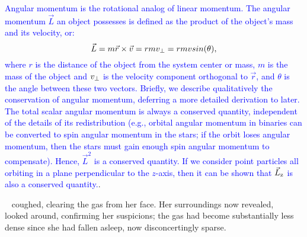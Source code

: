 \documentclass[main.tex]{subfiles}
\begin{document}
\begin{tcolorbox}[sharp corners, colback=blue!30, colframe=blue!80!blue, title=Angular Momentum]
\par \textcolor{blue} {Angular momentum is the rotational analog of linear momentum.  The angular momentum $\vec{L}$ an object possesses is defined as the product of the object's mass and its velocity, or:
\begin{equation}
\vec{L} = m\vec{r} \times \vec{v} = rmv_{\rm \perp} = rmvsin(\theta),
\end{equation}
where $r$ is the distance of the object from the system center or mass, $m$ is the mass of the object and $v_{\rm \perp}$ is the velocity component orthogonal to $\vec{r}$, and $\theta$ is the angle between these two vectors. 
Briefly, we describe qualitatively the conservation of angular momentum, deferring a more detailed derivation to later.  The total scalar angular momentum is always a conserved quantity, independent of the details of its redistribution (e.g., orbital angular momentum in binaries can be converted to spin angular momentum in the stars; if the orbit loses angular momentum, then the stars must gain enough spin angular momentum to compensate).  Hence, $\vec{L}^2$ is a conserved quantity.  If we consider point particles all orbiting in a plane perpendicular to the $z$-axis, then it can be shown that $\vec{L}_{\rm z}$ is also a conserved quantity.}.  
\end{tcolorbox}

\par \nar \rmsterope~ coughed, clearing the gas from her face.  Her surroundings now revealed, \rmsterope~ looked around, confirming her suspicions; the gas had become substantially less dense since she had fallen asleep, now disconcertingly sparse. 
\end{document}
